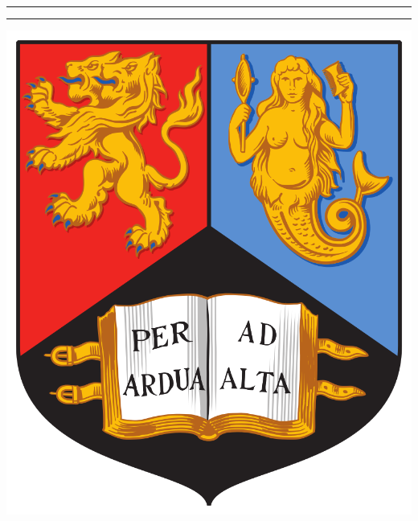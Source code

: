\documentclass[11pt]{article}
\title{\assignment}
\author{\me, \sid}
\date{\today}
\begin{document}
\maketitle											%
\vspace{-112px}										%
\noindent\rule{\linewidth}{1pt} \par				%
\vspace{100px}										%
\vspace{-20px}										%
\noindent\rule{\linewidth}{1pt} \par				%
\vspace{10px}										%
\vspace{-85px}										%
\noindent											%
\begin{minipage}{0.5\textwidth}\begin{flushleft}	%
\hspace{20px}										%
\includegraphics[scale = 0.06]{Resources/UoB}		%
\end{flushleft}\end{minipage}						%
\end{document}
